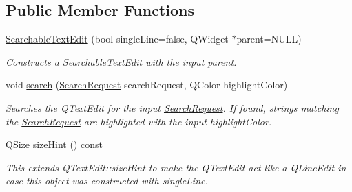 \subsection*{Public Member Functions}
\begin{DoxyCompactItemize}
\item 
\hyperlink{class_searchable_text_edit_ae77d9e73a636cc0c65d699a4d63125ee}{Searchable\-Text\-Edit} (bool single\-Line=false, Q\-Widget $\ast$parent=N\-U\-L\-L)
\begin{DoxyCompactList}\small\item\em Constructs a \hyperlink{class_searchable_text_edit}{Searchable\-Text\-Edit} with the input parent. \end{DoxyCompactList}\item 
\hypertarget{class_searchable_text_edit_af3053215da37605c82911b7088717abc}{void \hyperlink{class_searchable_text_edit_af3053215da37605c82911b7088717abc}{search} (\hyperlink{struct_search_request}{Search\-Request} search\-Request, Q\-Color highlight\-Color)}\label{class_searchable_text_edit_af3053215da37605c82911b7088717abc}

\begin{DoxyCompactList}\small\item\em Searches the Q\-Text\-Edit for the input \hyperlink{struct_search_request}{Search\-Request}. If found, strings matching the \hyperlink{struct_search_request}{Search\-Request} are highlighted with the input highlight\-Color. \end{DoxyCompactList}\item 
Q\-Size \hyperlink{class_searchable_text_edit_a730cb5990923f01bd5144038b633aca2}{size\-Hint} () const 
\begin{DoxyCompactList}\small\item\em This extends Q\-Text\-Edit\-::size\-Hint to make the Q\-Text\-Edit act like a Q\-Line\-Edit in case this object was constructed with single\-Line. \end{DoxyCompactList}\end{DoxyCompactItemize}
